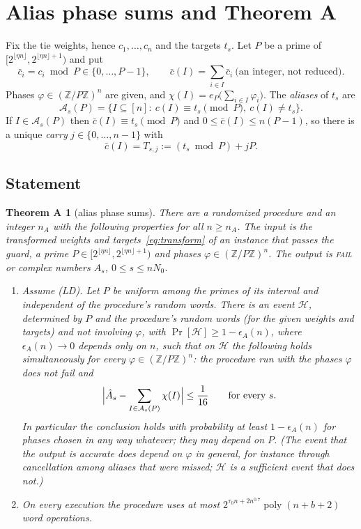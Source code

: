 \documentclass[11pt]{article}
\newtheorem*{thmA}{Theorem A}
\theoremstyle{definition}
\newcommand{\Z}{\mathbb Z}
\newcommand{\bc}{\bar c}
\newcommand{\floor}[1]{\lfloor #1\rfloor}
\newcommand{\poly}{\operatorname{poly}}
\newcommand{\cA}{\mathcal A}
\begin{document}
\section{Alias phase sums and Theorem A}\label{sec:alias}
Fix the tie weights, hence $c_1,\dots,c_n$ and the targets $t_s$. Let $P$ be a prime of
$[2^{\floor{\eta n}},2^{\floor{\eta n}+1})$ and put
\[
 \bc_i=c_i\bmod P\in\{0,\dots,P-1\},\qquad \bc(I)=\sum_{i\in I}\bc_i\ \text{(an integer, not reduced)}.
\]
Phases $\varphi\in(\Z/P\Z)^n$ are given, and $\chi(I)=e_P\bigl(\sum_{i\in I}\varphi_i\bigr)$. The \emph{aliases} of
$t_s$ are
\[
 \cA_s(P)=\{I\subseteq[n]:\ c(I)\equiv t_s\!\!\pmod P,\ c(I)\ne t_s\}.
\]
If $I\in\cA_s(P)$ then $\bc(I)\equiv t_s\pmod P$ and $0\le\bc(I)\le n(P-1)$, so there is a unique \emph{carry}
$j\in\{0,\dots,n-1\}$ with
\begin{equation}\label{eq:carry}
 \bc(I)=T_{s,j}:=(t_s\bmod P)+jP .
\end{equation}

\subsection{Statement}
\begin{thmA}[alias phase sums]
There are a randomized procedure and an integer $n_A$ with the following properties for all $n\ge n_A$. The input
is the transformed weights and targets~\eqref{eq:transform} of an instance that passes the guard, a prime
$P\in[2^{\floor{\eta n}},2^{\floor{\eta n}+1})$ and phases $\varphi\in(\Z/P\Z)^n$. The output is \textsc{fail} or
complex numbers $\hat A_s$, $0\le s\le nN_0$.
\begin{enumerate}[label=\textup{(\arabic*)}]
\item Assume \textup{(LD)}. Let $P$ be uniform among the primes of its interval and independent of the procedure's
random words. There is an event $\mathcal H$, determined by $P$ and the procedure's random words (for the given
weights and targets) and not involving $\varphi$, with $\Pr[\mathcal H]\ge1-\epsilon_A(n)$, where
$\epsilon_A(n)\to0$ depends only on $n$, such that on $\mathcal H$ the following holds \emph{simultaneously for
every} $\varphi\in(\Z/P\Z)^n$: the procedure run with the phases $\varphi$ does not fail and
\[
 \Bigl\lvert\hat A_s-\sum_{I\in\cA_s(P)}\chi(I)\Bigr\rvert\le\frac1{16}\qquad\text{for every }s .
\]
In particular the conclusion holds with probability at least $1-\epsilon_A(n)$ for phases chosen in any way
whatever; they may depend on $P$. (The event that the output is accurate does depend on $\varphi$ in general, for
instance through cancellation among aliases that were missed; $\mathcal H$ is a sufficient event that does not.)
\item On every execution the procedure uses at most $2^{\tau_0n+2n^{0.7}}\poly(n+b+2)$ word operations.
\end{enumerate}
\end{thmA}
\end{document}
